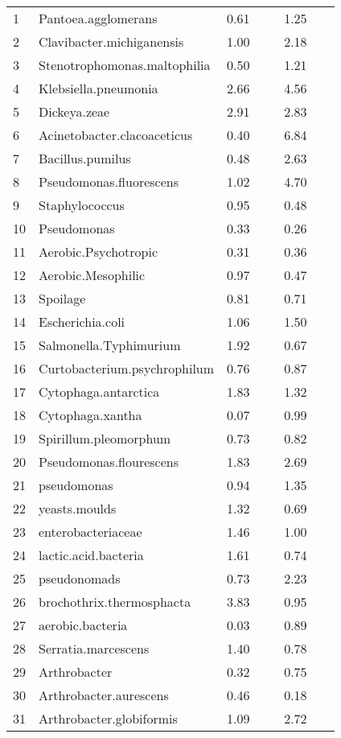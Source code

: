 \begin{longtable}{p{0.06\linewidth} p{0.33\linewidth} p{0.21\linewidth} p{0.21\linewidth}}
  1 & Pantoea.agglomerans & 0.61 & 1.25 \\ 
  2 & Clavibacter.michiganensis & 1.00 & 2.18 \\ 
  3 & Stenotrophomonas.maltophilia & 0.50 & 1.21 \\ 
  4 & Klebsiella.pneumonia & 2.66 & 4.56 \\ 
  5 & Dickeya.zeae & 2.91 & 2.83 \\ 
  6 & Acinetobacter.clacoaceticus & 0.40 & 6.84 \\ 
  7 & Bacillus.pumilus & 0.48 & 2.63 \\ 
  8 & Pseudomonas.fluorescens & 1.02 & 4.70 \\ 
  9 & Staphylococcus & 0.95 & 0.48 \\ 
  10 & Pseudomonas & 0.33 & 0.26 \\ 
  11 & Aerobic.Psychotropic & 0.31 & 0.36 \\ 
  12 & Aerobic.Mesophilic & 0.97 & 0.47 \\ 
  13 & Spoilage & 0.81 & 0.71 \\ 
  14 & Escherichia.coli & 1.06 & 1.50 \\ 
  15 & Salmonella.Typhimurium & 1.92 & 0.67 \\ 
  16 & Curtobacterium.psychrophilum & 0.76 & 0.87 \\ 
  17 & Cytophaga.antarctica & 1.83 & 1.32 \\ 
  18 & Cytophaga.xantha & 0.07 & 0.99 \\ 
  19 & Spirillum.pleomorphum & 0.73 & 0.82 \\ 
  20 & Pseudomonas.flourescens & 1.83 & 2.69 \\ 
  21 & pseudomonas & 0.94 & 1.35 \\ 
  22 & yeasts.moulds & 1.32 & 0.69 \\ 
  23 & enterobacteriaceae & 1.46 & 1.00 \\ 
  24 & lactic.acid.bacteria & 1.61 & 0.74 \\ 
  25 & pseudonomads & 0.73 & 2.23 \\ 
  26 & brochothrix.thermosphacta & 3.83 & 0.95 \\ 
  27 & aerobic.bacteria & 0.03 & 0.89 \\ 
  28 & Serratia.marcescens & 1.40 & 0.78 \\ 
  29 & Arthrobacter & 0.32 & 0.75 \\ 
  30 & Arthrobacter.aurescens & 0.46 & 0.18 \\ 
  31 & Arthrobacter.globiformis & 1.09 & 2.72 \\ 

\end{longtable}
